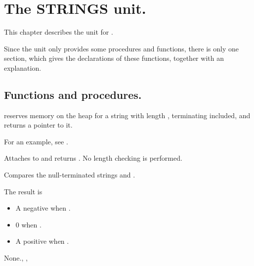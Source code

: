 %
%
%
%
%
\chapter{The STRINGS unit.}
This chapter describes the  unit for 
\fpc. 

Since the unit only provides some procedures and functions, there is
only one section, which gives the declarations of these functions, together
with an explanation. 

\section{Functions and procedures.}

{
 reserves memory on the heap for a string with length ,
terminating  included, and returns a pointer to it.
}

For an example, see .

{
Attaches  to  and returns .
}
{No length checking is performed.}
{}



{
Compares the null-terminated strings  and .

The result is 
\begin{itemize}
\item A negative  when .
\item 0 when .
\item A positive  when .
\end{itemize}
}
{None.}{, , }

